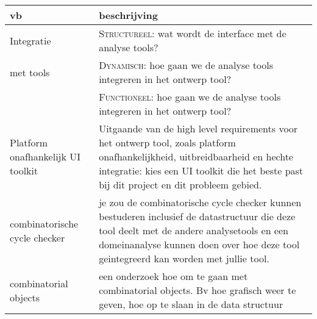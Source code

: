 \begin{center}
    \begin{tabular}{|p{2.5cm}|p{10cm}|}
    \hline
        {\bf vb}		& {\bf beschrijving} \\\hline
        Integratie		& \textsc{Structureel}: wat wordt de interface met de analyse tools? \\
	met tools 		& \textsc{Dynamisch}: hoe gaan we de analyse tools integreren in het ontwerp tool?\\
				& \textsc{Functioneel}: hoe gaan we de analyse tools integreren in het ontwerp tool?\\\hline
        Platform onafhankelijk UI toolkit & Uitgaande van de high level requirements voor het ontwerp
					    tool, zoals platform onafhankelijkheid, uitbreidbaarheid
					    en hechte integratie: kies een UI toolkit die het
					    beste past bij dit project en dit probleem gebied.\\\hline
        combinatorische cycle checker & je zou de combinatorische cycle checker kunnen bestuderen inclusief de datastructuur die
					deze tool deelt met de andere analysetools en een domeinanalyse kunnen doen
					over hoe deze tool geintegreerd kan worden met jullie tool.\\\hline
        combinatorial objects &  een onderzoek hoe om te gaan met combinatorial objects.
				    Bv hoe grafisch weer te geven, hoe op te slaan in de data structuur\\\hline
    \end{tabular}
\end{center}


